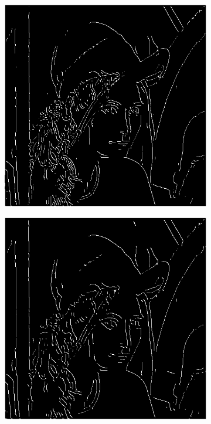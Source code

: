 \documentclass[a4paper]{article}
\begin{document}
\begin{figure}[h]
\begin{subfigure}{0.33\textwidth}
\includegraphics[width=\textwidth]{img/sigma2/lenanont.png}
\end{subfigure}
\begin{subfigure}{0.33\textwidth}
\includegraphics[width=\textwidth]{img/sigma3/lenanont.png}
\end{subfigure}


\end{figure}
\end{document}
